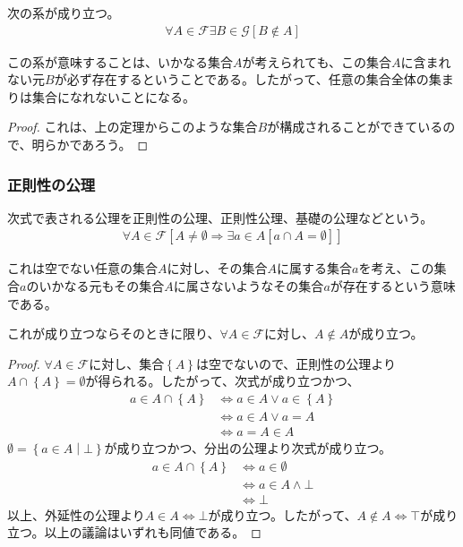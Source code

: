 \documentclass[a4paper]{jsarticle}
\begin{document}
\begin{thm}
\label{1.2.1.13}
次の系が成り立つ。
\begin{align*}
\forall A\in \mathcal{F\exists}B \in \mathcal{G}[ B \notin A]
\end{align*}
\end{thm}
この系が意味することは、いかなる集合$A$が考えられても、この集合$A$に含まれない元$B$が必ず存在するということである。したがって、任意の集合全体の集まりは集合になれないことになる。
\begin{proof}
これは、上の定理からこのような集合$B$が構成されることができているので、明らかであろう。
\end{proof}
\subsubsection{正則性の公理}%
\begin{axs}
次式で表される公理を正則性の公理、正則性公理、基礎の公理などという。
\begin{align*}
\forall A\in \mathcal{F}\left[ A \neq \emptyset \Rightarrow \exists a \in A[ a \cap A = \emptyset] \right]
\end{align*}
\end{axs}
これは空でない任意の集合$A$に対し、その集合$A$に属する集合$a$を考え、この集合$a$のいかなる元もその集合$A$に属さないようなその集合$a$が存在するという意味である。
\begin{thm}
\label{1.2.1.14}
これが成り立つならそのときに限り、$\forall A\in \mathcal{F}$に対し、$A \notin A$が成り立つ。
\end{thm}
\begin{proof}
$\forall A\in \mathcal{F}$に対し、集合$\left\{ A \right\}$は空でないので、正則性の公理より$A \cap \left\{ A \right\} = \emptyset$が得られる。したがって、次式が成り立つかつ、
\begin{align*}
a \in A \cap \left\{ A \right\} &\Leftrightarrow a \in A \vee a \in \left\{ A \right\} \\ 
&\Leftrightarrow a \in A \vee a = A \\
&\Leftrightarrow a = A \in A
\end{align*}
$\emptyset = \left\{ a \in A \middle| \bot \right\}$が成り立つかつ、分出の公理より次式が成り立つ。
\begin{align*}
a \in A \cap \left\{ A \right\} &\Leftrightarrow a \in \emptyset \\
&\Leftrightarrow a \in A \land \bot \\
&\Leftrightarrow \bot
\end{align*}
以上、外延性の公理より$A \in A \Leftrightarrow \bot$が成り立つ。したがって、$A \notin A \Leftrightarrow \top$が成り立つ。以上の議論はいずれも同値である。
\end{proof}
\end{document}
